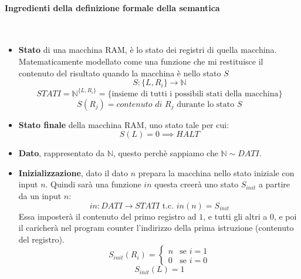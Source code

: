 \documentclass{article}
\begin{document}
\paragraph{Ingredienti della definizione formale della semantica}\mbox{}\\
\begin{itemize}
    \item \textbf{Stato} di una macchina RAM, è lo stato dei registri di quella macchina.
          Matematicamente modellato come una funzione che mi restituisce il contenuto
          del risultato quando la macchina è nello stato $S$
          $$S:\{L, R_i\}\rightarrow\mathbb{N}$$
          $$STATI=\mathbb{N}^{\{L,R_i\}}=\{\text{insieme di tutti i possibili stati della macchina}\}$$
          $$S(R_j) = \textit{contenuto di } R_j\text{ durante lo stato } S$$

    \item \textbf{Stato finale} della macchina RAM, uno stato tale per cui:$$S(L)=0\implies HALT$$
    \item \textbf{Dato}, rappresentato da $\mathbb{N}$, questo perchè sappiamo che $\mathbb{N}\sim DATI$.
    \item \textbf{Inizializzazione}, dato il dato $n$ prepara la macchina nello stato iniziale
          con input $n$. Quindi sarà una funzione $in$ questa creerà uno stato $S_{init}$ a partire
          da un input $n$:
          $$in:DATI\rightarrow STATI \text{ t.c. } in(n)=S_{init}$$
          Essa imposterà il contenuto del primo registro ad $1$, e tutti gli altri a $0$, e poi
          il caricherà nel program counter l'indirizzo della prima istruzione (contenuto
          del registro).
          \[
              S_{init}(R_i)=
              \begin{cases}
                  n & \text{se } i=1 \\
                  0 & \text{se } i=0
              \end{cases}
          \]
          $$S_{init}(L)=1$$


\end{itemize}
\end{document}
